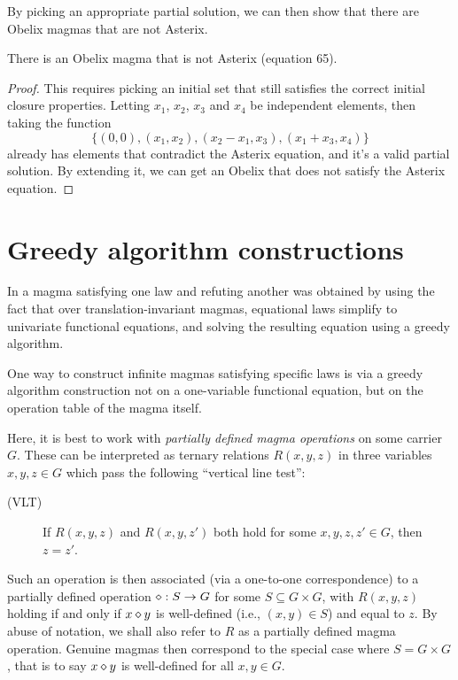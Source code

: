 By picking an appropriate partial solution, we can then show that there are Obelix magmas that are not Asterix.
\begin{corollary}
There is an Obelix magma that is not Asterix (equation 65).
\end{corollary}
\begin{proof}
This requires picking an initial set that still satisfies the correct initial closure properties. Letting
$x_1$, $x_2$, $x_3$ and $x_4$ be independent elements, then taking the function
$$\{(0,0), (x_1,x_2), (x_2-x_1, x_3), (x_1+x_3, x_4)\}$$
already has elements that contradict the Asterix equation, and it's a valid partial solution. By extending
it, we can get an Obelix that does not satisfy the Asterix equation.
\end{proof}

\section{Greedy algorithm constructions}\label{greedy-section}

In  a magma satisfying one law and refuting another was obtained by using the
fact that over translation-invariant magmas, equational laws simplify to univariate functional equations,
and solving the resulting equation using a greedy algorithm.

One way to construct infinite magmas satisfying specific laws is via a greedy algorithm construction not on a
one-variable functional equation, but on the operation table of the magma itself.

Here, it is best to work with \emph{partially defined magma operations} on some carrier $G$.  These can be interpreted as ternary relations $R(x,y,z)$ in three variables $x,y,z \in G$ which pass the following ``vertical line test'':

\begin{description}
  \item[(VLT)] If $R(x,y,z)$ and $R(x,y,z')$ both hold for some $x,y,z,z' \in G$, then $z=z'$.
\end{description}

Such an operation is then associated (via a one-to-one correspondence) to a partially defined operation $\diamond : S \to G$ for some $S \subseteq G \times G$, with $R(x,y,z)$ holding if and only if $x \diamond y$ is well-defined (i.e., $(x,y) \in S$) and equal to $z$.  By abuse of notation, we shall also refer to $R$ as a partially defined magma operation.  Genuine magmas then correspond to the special case where $S = G \times G$, that is to say $x \diamond y$ is well-defined for all $x,y \in G$.

